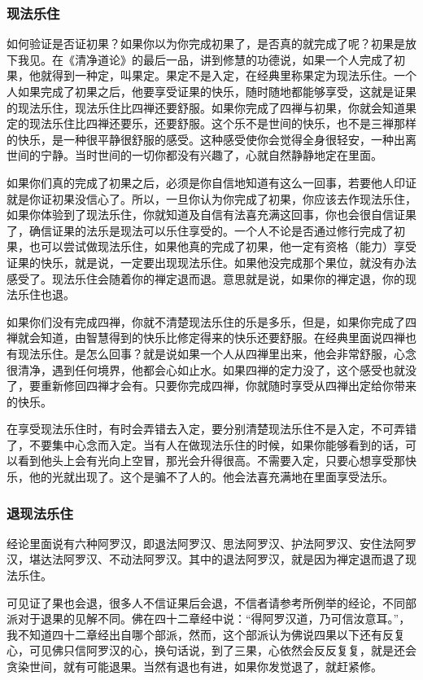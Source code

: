 \documentclass{book}
\begin{document}
\subsubsection{现法乐住}

如何验证是否证初果？如果你以为你完成初果了，是否真的就完成了呢？初果是放下我见。在《清净道论》的最后一品，讲到修慧的功德说，如果一个人完成了初果，他就得到一种定，叫果定。果定不是入定，在经典里称果定为现法乐住。一个人如果完成了初果之后，他要享受证果的快乐，随时随地都能够享受，这就是证果的现法乐住，现法乐住比四禅还要舒服。如果你完成了四禅与初果，你就会知道果定的现法乐住比四禅还要乐，还要舒服。这个乐不是世间的快乐，也不是三禅那样的快乐，是一种很平静很舒服的感受。这种感受使你会觉得全身很轻安，一种出离世间的宁静。当时世间的一切你都没有兴趣了，心就自然静静地定在里面。

如果你们真的完成了初果之后，必须是你自信地知道有这么一回事，若要他人印证就是你证初果没信心了。所以，一旦你认为你完成了初果，你应该去作现法乐住，如果你体验到了现法乐住，你就知道及自信有法喜充满这回事，你也会很自信证果了，确信证果的法乐是现法可以乐住享受的。一个人不论是否通过修行完成了初果，也可以尝试做现法乐住，如果他真的完成了初果，他一定有资格（能力）享受证果的快乐，就是说，一定要出现现法乐住。如果他没完成那个果位，就没有办法感受了。现法乐住会随着你的禅定退而退。意思就是说，如果你的禅定退，你的现法乐住也退。

如果你们没有完成四禅，你就不清楚现法乐住的乐是多乐，但是，如果你完成了四禅就会知道，由智慧得到的快乐比修定得来的快乐还要舒服。在经典里面说四禅也有现法乐住。是怎么回事？就是说如果一个人从四禅里出来，他会非常舒服，心念很清净，遇到任何境界，他都会心如止水。如果四禅的定力没了，这个感受也就没了，要重新修回四禅才会有。只要你完成四禅，你就随时享受从四禅出定给你带来的快乐。

在享受现法乐住时，有时会弄错去入定，要分别清楚现法乐住不是入定，不可弄错了，不要集中心念而入定。当有人在做现法乐住的时候，如果你能够看到的话，可以看到他头上会有光向上空冒，那光会升得很高。不需要入定，只要心想享受那快乐，他的光就出现了。这个是骗不了人的。他会法喜充满地在里面享受法乐。

\subsubsection{退现法乐住}

经论里面说有六种阿罗汉，即退法阿罗汉、思法阿罗汉、护法阿罗汉、安住法阿罗汉，堪达法阿罗汉、不动法阿罗汉。其中的退法阿罗汉，就是因为禅定退而退了现法乐住。

可见证了果也会退，很多人不信证果后会退，不信者请参考所例举的经论，不同部派对于退果的见解不同。佛在四十二章经中说：``得阿罗汉道，乃可信汝意耳。''，我不知道四十二章经出自哪个部派，然而，这个部派认为佛说四果以下还有反复心，可见佛只信阿罗汉的心，换句话说，到了三果，心依然会反反复复，就是还会贪染世间，就有可能退果。当然有退也有进，如果你发觉退了，就赶紧修。
\end{document}
